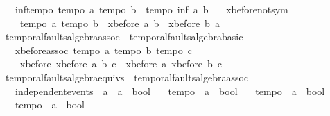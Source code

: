 \begin{isabellebody}
\ \ \ inf{\isacharunderscore}tempo{}{\isacharcolon}\ {\isachardoublequoteopen}{\isasymlbrakk}tempo{}\ a{\isacharsemicolon}\ tempo{}\ b{\isasymrbrakk}\ {\isasymLongrightarrow}\ tempo{}\ {\isacharparenleft}inf\ a\ b{\isacharparenright}{\isachardoublequoteclose}\isanewline
\ \ \ xbefore{\isacharunderscore}not{\isacharunderscore}sym{\isacharcolon}\ \isanewline
\ \ \ \ {\isachardoublequoteopen}{\isasymlbrakk}tempo{}\ a{\isacharsemicolon}\ tempo{}\ b{\isasymrbrakk}\ {\isasymLongrightarrow}\ {\isacharparenleft}xbefore\ a\ b{\isacharparenright}\ {\isasymle}\ {\isacharminus}{\isacharparenleft}xbefore\ b\ a{\isacharparenright}{\isachardoublequoteclose}%
\isamarkuptrue%
\isamarkupfalse%
\ temporal{\isacharunderscore}faults{\isacharunderscore}algebra{\isacharunderscore}assoc\ {\isacharequal}\ temporal{\isacharunderscore}faults{\isacharunderscore}algebra{\isacharunderscore}basic\ {\isacharplus}\isanewline
\ \ \ xbefore{\isacharunderscore}assoc{\isacharcolon}\ {\isachardoublequoteopen}{\isasymlbrakk}tempo{}\ a{\isacharsemicolon}\ tempo{}\ b{\isacharsemicolon}\ tempo{}\ c{\isasymrbrakk}\ {\isasymLongrightarrow}\ \isanewline
\ \ \ \ xbefore\ {\isacharparenleft}xbefore\ a\ b{\isacharparenright}\ c\ {\isacharequal}\ xbefore\ a\ {\isacharparenleft}xbefore\ b\ c{\isacharparenright}{\isachardoublequoteclose}%
\isamarkuptrue%
\isamarkupfalse%
\ temporal{\isacharunderscore}faults{\isacharunderscore}algebra{\isacharunderscore}equivs\ {\isacharequal}\ temporal{\isacharunderscore}faults{\isacharunderscore}algebra{\isacharunderscore}assoc\ {\isacharplus}\isanewline
\ \ \ independent{\isacharunderscore}events\ {\isacharcolon}{\isacharcolon}\ {\isachardoublequoteopen}{\isacharprime}a\ {\isasymRightarrow}\ {\isacharprime}a\ {\isasymRightarrow}\ bool{\isachardoublequoteclose}\isanewline
\ \ \ tempo{}\ {\isacharcolon}{\isacharcolon}\ {\isachardoublequoteopen}{\isacharprime}a\ {\isasymRightarrow}\ bool{\isachardoublequoteclose}\isanewline
\ \ \ tempo{}\ {\isacharcolon}{\isacharcolon}\ {\isachardoublequoteopen}{\isacharprime}a\ {\isasymRightarrow}\ bool{\isachardoublequoteclose}\isanewline
\ \ \ tempo{}\ {\isacharcolon}{\isacharcolon}\ {\isachardoublequoteopen}{\isacharprime}a\ {\isasymRightarrow}\ bool{\isachardoublequoteclose}\isanewline

\end{isabellebody}
